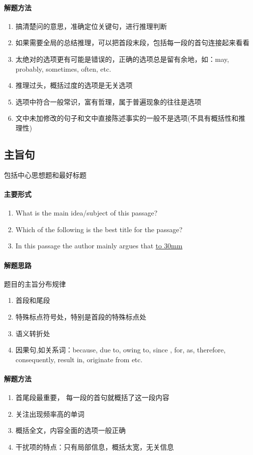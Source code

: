\documentclass[a4paper]{ctexart}
\begin{document}
\paragraph{解题方法}
\begin{enumerate}
    \item 搞清楚问的意思，准确定位关键句，进行推理判断
    \item 如果需要全局的总结推理，可以把首段末段，包括每一段的首句连接起来看看
    \item 太绝对的选项更有可能是错误的，正确的选项总是留有余地，如：may, probably, sometimes, often, etc.
    \item 推理过头，概括过度的选项是无关选项
    \item 选项中符合一般常识，富有哲理，属于普遍现象的往往是选项
    \item 文中未加修改的句子和文中直接陈述事实的一般不是选项(不具有概括性和推理性)
\end{enumerate}

\subsection{主旨句}
包括中心思想题和最好标题
\paragraph{主要形式}
\begin{enumerate}
    \item What is the main idea/subject of this passage?
    \item Which of the following is the best title for the passage?
    \item In this passage the author mainly argues that \underline{\hbox to 30mm{}} 
\end{enumerate}
\paragraph{解题思路}
题目的主旨分布规律
\begin{enumerate}
    \item 首段和尾段
    \item 特殊标点符号处，特别是首段的特殊标点处
    \item 语义转折处
    \item 因果句,如关系词：because, due to, owing to, since , for, as, therefore, consequently, result in, originate from etc.
\end{enumerate}

\paragraph{解题方法}
\begin{enumerate}
    \item 首尾段最重要， 每一段的首句就概括了这一段内容
    \item 关注出现频率高的单词
    \item 概括全文，内容全面的选项一般正确
    \item 干扰项的特点：只有局部信息，概括太宽，无关信息
\end{enumerate}
\end{document}
